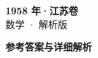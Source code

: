 \documentclass[zihao=-4, a4paper]{ctexart}
\begin{document}
\begin{center}
  {\Large\bfseries 1958 年·江苏卷}\\[4pt]
  {\large 数学 · 解析版}
\end{center}
\medskip
{}

\clearpage
{}
\begin{center}{\Large\bfseries 参考答案与详细解析}\end{center}
\medskip

\end{document}
